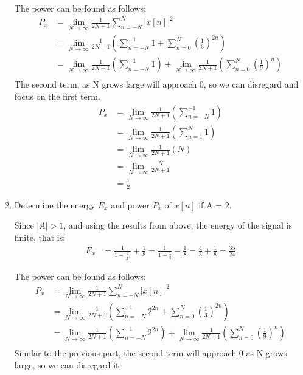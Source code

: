 \documentclass{article}
\begin{document}
\begin{enumerate}[label=\alph*.]
    The power can be found as follows:
    \begin{align*}
        P_x &= \lim_{N \to \infty} \frac{1}{2N + 1} \sum_{n=-N}^{N} |x[n]|^2 \\
        &= \lim_{N \to \infty} \frac{1}{2N + 1} \left(\sum_{n=-N}^{-1} 1 + \sum_{n=0}^{N} \left(\frac{1}{3}\right)^{2n}\right) \\
        &= \lim_{N \to \infty} \frac{1}{2N + 1} \left(\sum_{n=-N}^{-1} 1\right) + 
        \lim_{N \to \infty} \frac{1}{2N+1}\left(\sum_{n=0}^{N} \left(\frac{1}{9}\right)^{n}\right)\\
    \end{align*}
    The second term, as N grows large will approach 0, so we can disregard and focus on the first term.
    \begin{align*}
        P_x &= \lim_{N \to \infty} \frac{1}{2N + 1} \left(\sum_{n=-N}^{-1} 1\right) \\
        &= \lim_{N \to \infty} \frac{1}{2N + 1} \left(\sum_{n=1}^{N} 1\right) \\
        &= \lim_{N \to \infty} \frac{1}{2N + 1} \left(N\right) \\
        &= \lim_{N \to \infty} \frac{N}{2N + 1} \\
        &= \frac{1}{2}
    \end{align*}

    \item Determine the energy $E_x$ and power $P_x$ of $x[n]$ if A = 2.

    Since $|A| > 1$, and using the results from above, the energy of the signal is finite, that is:
    \begin{align*}
        E_x &= \frac{1}{1 - \frac{1}{A^2}} + \frac{1}{8} = \frac{1}{1 - \frac{1}{4}} - \frac{1}{8} = \frac{4}{3} + \frac{1}{8} = \frac{35}{24}
    \end{align*}

    The power can be found as follows:
    \begin{align*}
        P_x &= \lim_{N \to \infty} \frac{1}{2N + 1} \sum_{n=-N}^{N} |x[n]|^2 \\
        &= \lim_{N \to \infty} \frac{1}{2N + 1} \left(\sum_{n=-N}^{-1} 2^{2n} + \sum_{n=0}^{N} \left(\frac{1}{3}\right)^{2n}\right) \\
        &= \lim_{N \to \infty} \frac{1}{2N + 1} \left(\sum_{n=-N}^{-1} 2^{2n}\right) + 
        \lim_{N \to \infty} \frac{1}{2N+1}\left(\sum_{n=0}^{N} \left(\frac{1}{9}\right)^{n}\right)\\
    \end{align*}
    Similar to the previous part, the second term will approach 0 as N grows large, so we can disregard it.


\end{enumerate}
\end{document}
